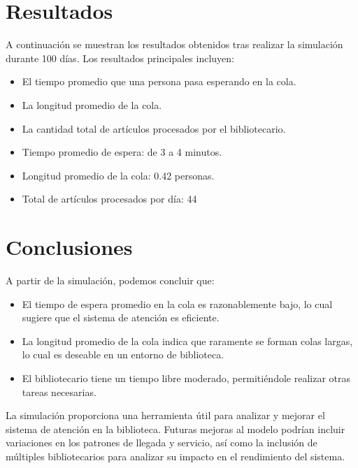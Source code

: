 \documentclass{article}
\begin{document}
\newpage

\section{Resultados}
    A continuación se muestran los resultados obtenidos tras realizar la simulación durante 100 días. Los resultados principales incluyen:
    \begin{itemize}
        \item El tiempo promedio que una persona pasa esperando en la cola.
        \item La longitud promedio de la cola.
        \item La cantidad total de artículos procesados por el bibliotecario.
    \end{itemize}

    \begin{itemize}
        \item Tiempo promedio de espera: de 3 a 4 minutos.
        \item Longitud promedio de la cola: 0.42 personas.
        \item Total de artículos procesados por día: 44
    \end{itemize}
\section{Conclusiones}
    A partir de la simulación, podemos concluir que:
    \begin{itemize}
        \item El tiempo de espera promedio en la cola es razonablemente bajo, lo cual sugiere que el sistema de atención es eficiente.
        \item La longitud promedio de la cola indica que raramente se forman colas largas, lo cual es deseable en un entorno de biblioteca.
        \item El bibliotecario tiene un tiempo libre moderado, permitiéndole realizar otras tareas necesarias.
    \end{itemize}

    La simulación proporciona una herramienta útil para analizar y mejorar el sistema de atención en la biblioteca. Futuras mejoras al modelo podrían incluir 
    variaciones en los patrones de llegada y servicio, así como la inclusión de múltiples bibliotecarios para analizar su impacto en el rendimiento del sistema.
\end{document}
